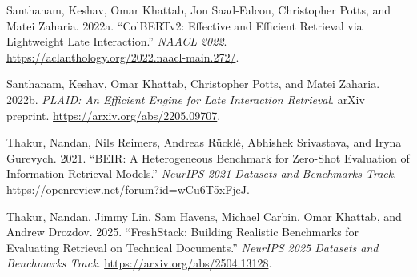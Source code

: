 \documentclass[
  11pt,
  letterpaper,
  numbers=noendperiod,
  parskip=half]{scrartcl}
\newlength{\cslhangindent}
\newenvironment{CSLReferences}[2] %
 {\begin{list}{}{%
  \setlength{\itemindent}{0pt}
  \setlength{\leftmargin}{0pt}
  \setlength{\parsep}{0pt}
  \ifodd #1
   \setlength{\leftmargin}{\cslhangindent}
   \setlength{\itemindent}{-1\cslhangindent}
  \fi
  \setlength{\itemsep}{#2\baselineskip}}}
 {\end{list}}
\begin{document}
\begin{CSLReferences}{1}{1}
Santhanam, Keshav, Omar Khattab, Jon Saad-Falcon, Christopher Potts, and
Matei Zaharia. 2022a. {``{ColBERTv2}: Effective and Efficient Retrieval
via Lightweight Late Interaction.''} \emph{NAACL 2022}.
\url{https://aclanthology.org/2022.naacl-main.272/}.

Santhanam, Keshav, Omar Khattab, Christopher Potts, and Matei Zaharia.
2022b. \emph{{PLAID}: An Efficient Engine for Late Interaction
Retrieval}. arXiv preprint. \url{https://arxiv.org/abs/2205.09707}.

Thakur, Nandan, Nils Reimers, Andreas Rücklé, Abhishek Srivastava, and
Iryna Gurevych. 2021. {``{BEIR}: A Heterogeneous Benchmark for
Zero-Shot Evaluation of Information Retrieval Models.''} \emph{NeurIPS
2021 Datasets and Benchmarks Track}.
\url{https://openreview.net/forum?id=wCu6T5xFjeJ}.

Thakur, Nandan, Jimmy Lin, Sam Havens, Michael Carbin, Omar Khattab, and
Andrew Drozdov. 2025. {``FreshStack: Building Realistic Benchmarks for
Evaluating Retrieval on Technical Documents.''} \emph{NeurIPS 2025
Datasets and Benchmarks Track}. \url{https://arxiv.org/abs/2504.13128}.

\end{CSLReferences}
\end{document}
